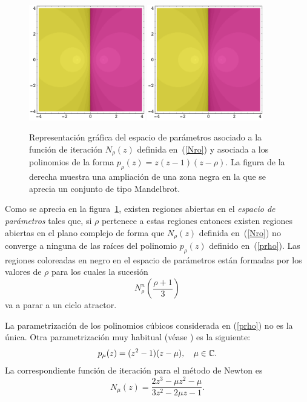 \begin{figure}[htb]
\centering
\includegraphics[width=0.45\textwidth]{NDfigura0.pdf}
\qquad
 \includegraphics[width=0.45\textwidth]{NDfigura0.pdf}
\caption{Representación gráfica del espacio de parámetros asociado a la función de iteración $N_{\rho}(z)$ definida en~(\ref{Nro}) y asociada a los polinomios de la forma $p_{\rho}(z) = z (z-1)(z-\rho)$. La figura de la derecha muestra una ampliación de una zona negra en la que se aprecia  un conjunto de tipo Mandelbrot.}
 \label{esparam_fig0}
\end{figure}


Como se aprecia en la figura~\ref{esparam_fig0}, existen regiones abiertas en el \emph{espacio de parámetros} tales que, si $\rho$ pertenece a estas regiones entonces existen regiones abiertas en el plano complejo de forma que 
$N_{\rho}(z)$ definida en~(\ref{Nro}) no converge a ninguna de las raíces del polinomio $p_{\rho}(z)$ definido en~(\ref{prho}). Las regiones coloreadas en negro en el espacio de parámetros están formadas por los valores de $\rho$ para los cuales la sucesión
$$
N_{\rho}^{n}\left(\frac{\rho+1}{3}\right)
$$ 
va a parar a  un ciclo atractor.

La parametrización de los polinomios cúbicos considerada en (\ref{prho}) no es la única. Otra parametrización muy habitual (véase \cite{Roberts}) es la siguiente:
\begin{equation}\label{pnu}
p_{\mu}(z)=(z^2-1)(z-\mu), \quad \mu\in\mathbb{C}.
\end{equation}
La correspondiente función de iteración para el método de Newton es
\begin{equation}\label{Nnu}
 N_{\mu}(z)=\frac{ 2z^3-\mu z^2-\mu}{3 z^2-2 \mu z-1}.
\end{equation}

